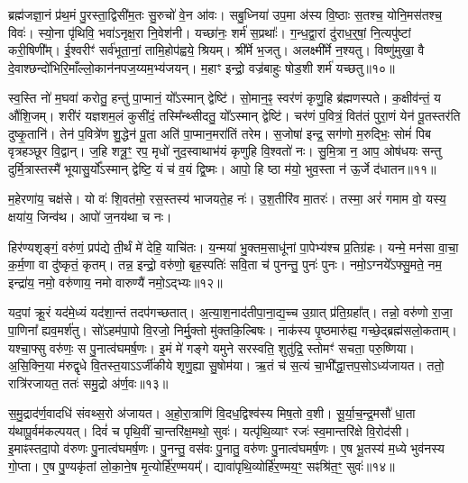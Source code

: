 ब्रह्म॑जज्ञा॒नं प्र॑थ॒मं पु॒रस्ता॒द्विसी॑म॒तः सु॒रुचो॑ वे॒न आ॑वः। 
सबु॒ध्निया॑ उप॒मा अ॑स्य वि॒ष्ठाः स॒तश्च॒ योनि॒मस॑तश्च॒ विवः॑। 
स्यो॒ना पृ॑थिवि॒ भवा॑ऽनृक्ष॒रा नि॒वेश॑नी। 
यच्छा॑नः॒ शर्म॑ स॒प्रथाः᳚। 
ग॒न्ध॒द्वा॒रां दु॑राध॒र्॒‌षां॒ नि॒त्यपु॑ष्टां करी॒षिणी᳚म्। 
ई॒श्वरीꣳ॑ सर्व॑भूता॒नां॒ तामि॒होप॑ह्वये॒ श्रियम्। 
श्री᳚र्मे भ॒जतु। 
अलक्ष्मी᳚र्मे न॒श्यतु। 
विष्णु॑मुखा॒ वै दे॒वाश्छन्दो॑भिरि॒माँल्लो॒कान॑नप\-ज॒य्यम॒भ्य॑जयन्। 
म॒हाꣳ इन्द्रो॒ वज्र॑बाहुः षोड॒शी शर्म॑ यच्छतु॥१०॥

 स्व॒स्ति नो॑ म॒घवा॑ करोतु॒ हन्तु॑ पा॒प्मानं॒ यो᳚ऽस्मान् द्वेष्टि॑। 
 सो॒मान॒ꣴ॒ स्वर॑णं कृणु॒हि ब्र॑ह्मणस्पते। 
 क॒क्षीव॑न्तं॒ य औ॑शि॒जम्। 
 शरी॑रं यज्ञशम॒लं कुसी॑दं॒ तस्मि᳚न्थ्सीदतु॒ यो᳚ऽस्मान् द्वेष्टि॑। 
 चर॑णं प॒वित्रं॒ वित॑तं पुरा॒णं येन॑ पू॒तस्तर॑ति दुष्कृ॒तानि॑। 
 तेन॑ प॒वित्रे॑ण शु॒द्धेन॑ पू॒ता अति॑ पा॒प्मान॒मरा॑तिं तरेम। 
 स॒जोषा॑ इन्द्र॒ सग॑णो म॒रुद्भिः॒ सोमं॑ पिब वृत्रहञ्छूर वि॒द्वान्। 
 ज॒हि शत्रू॒ꣳ॒ रप॒ मृधो॑ नुद॒स्वाथाभ॑यं कृणुहि वि॒श्वतो॑ नः। 
 सु॒मि॒त्रा न॒ आप॒ ओष॑धयः सन्तु दुर्मि॒त्रास्तस्मै॑ भूयासु॒र्यो᳚ऽस्मान् द्वेष्टि॒ यं च॑ व॒यं द्वि॒ष्मः। 
 आपो॒ हि ष्ठा म॑यो॒ भुव॒स्ता न॑ ऊ॒र्जे द॑धातन॥११॥
 
 म॒हेरणा॑य॒ चक्ष॑से। 
 यो वः॑ शि॒वत॑मो॒ रस॒स्तस्य॑ भाजयते॒ह नः॑। 
 उ॒श॒तीरि॑व मा॒तरः॑। 
 तस्मा॒ अरं॑ गमाम वो॒ यस्य॒ क्षया॑य॒ जिन्व॑थ। 
 आपो॑ ज॒नय॑था च नः।

 
हिर॑ण्यशृङ्गं॒ वरु॑णं॒ प्रप॑द्ये ती॒र्थं मे॑ देहि॒ याचि॑तः। 
य॒न्मया॑ भु॒क्तम॒साधू॑नां पा॒पेभ्य॑श्च प्र॒तिग्र॑हः। 
यन्मे॒ मन॑सा वा॒चा॒ क॒र्म॒णा वा दु॑ष्कृतं॒ कृतम्। 
तन्न॒ इन्द्रो॒ वरु॑णो॒ बृह॒स्पतिः॑ सवि॒ता च॑ पुनन्तु॒ पुनः॑ पुनः। 
नमो॒ऽग्नये᳚ऽफ्सु॒मते॒ नम॒ इन्द्रा॑य॒ नमो॒ वरु॑णाय॒ नमो वारुण्यै॑ नमो॒ऽद्भ्यः॥१२॥

 यद॒पां क्रू॒रं यद॑मे॒ध्यं यद॑शा॒न्तं तदप॑गच्छतात्। 
 अ॒त्या॒श॒नाद॑ती\-पा॒ना॒द्य॒च्च उ॒ग्रात् प्र॑ति॒ग्रहा᳚त्। 
 तन्नो॒ वरु॑णो रा॒जा॒ पा॒णिना᳚ ह्यव॒मर्\mbox{}श॑तु। 
 सो॑ऽहम॑पा॒पो वि॒रजो॒ निर्मु॒क्तो मु॑क्तकि॒ल्बिषः। 
 नाक॑स्य पृ॒ष्ठमारु॑ह्य॒ गच्छे॒द्ब्रह्म॑सलो॒कताम्। 
 यश्चा॒फ्सु वरु॑णः॒ स पु॒नात्व॑घमर्\mbox{}ष॒णः। 
 इ॒मं मे॑ गङ्गे यमुने सरस्वति॒ शुतु॑द्रि॒ स्तोमꣳ॑ सचता॒ परु॒ष्णिया। 
 अ॒सि॒क्नि॒या म॑रुद्\mbox{}वृधे वि॒तस्त॒याऽऽर्जी॑कीये शृणु॒ह्या सु॒षोम॑या। 
 ऋ॒तं च॑ स॒त्यं चा॒भी᳚द्धा॒त्तप॒सोऽध्य॑जायत। 
 ततो॒ रात्रि॑रजायत॒ ततः॑ समु॒द्रो अ॑र्ण॒वः॥१३॥
 
 स॒मु॒द्राद॑र्ण॒वादधि॑ संवथ्स॒रो अ॑जायत। 
 अ॒हो॒रा॒त्राणि॑ वि॒दध॒द्विश्व॑स्य मिष॒तो व॒शी। 
 सू॒र्या॒च॒न्द्र॒मसौ॑ धा॒ता य॑थापू॒र्वम॑\-कल्प\-यत्। 
 दिवं॑ च पृथि॒वीं चा॒न्तरि॑क्ष॒मथो॒ सुवः॑। 
 यत्पृ॑थि॒व्याꣳ रजः॑ स्व॒मान्तरि॑क्षे वि॒रोद॑सी। 
 इ॒माꣴस्तदा॒पो व॑रुणः पु॒नात्व॑घमर्\mbox{}ष॒णः। 
 पु॒नन्तु॒ वस॑वः पु॒नातु॒ वरु॑णः पु॒नात्व॑घमर्\mbox{}ष॒णः। 
 ए॒ष भू॒तस्य॑ म॒ध्ये भुव॑नस्य गो॒प्ता। 
 ए॒ष पु॒ण्यकृ॑तां लो॒का॒ने॒ष मृ॒त्योर्\mbox{}हि॑र॒ण्मयम्᳚। 
 द्यावा॑पृथि॒व्योर्\mbox{}हि॑र॒ण्मय॒ꣳ॒ सꣴश्रि॑त॒ꣳ॒ सुवः॑॥१४॥


